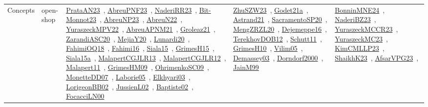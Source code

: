 {\begin{longtable}{lp{3cm}>{\raggedright\arraybackslash}p{6cm}>{\raggedright\arraybackslash}p{6cm}>{\raggedright\arraybackslash}p{8cm}}
\index{open-shop}\index{Concepts!open-shop}Concepts & open-shop & \href{../works/PrataAN23.pdf}{PrataAN23}~\cite{PrataAN23}, \href{../works/AbreuPNF23.pdf}{AbreuPNF23}~\cite{AbreuPNF23}, \href{../works/NaderiRR23.pdf}{NaderiRR23}~\cite{NaderiRR23}, \href{../works/Bit-Monnot23.pdf}{Bit-Monnot23}~\cite{Bit-Monnot23}, \href{../works/AbreuNP23.pdf}{AbreuNP23}~\cite{AbreuNP23}, \href{../works/AbreuN22.pdf}{AbreuN22}~\cite{AbreuN22}, \href{../works/YuraszeckMPV22.pdf}{YuraszeckMPV22}~\cite{YuraszeckMPV22}, \href{../works/AbreuAPNM21.pdf}{AbreuAPNM21}~\cite{AbreuAPNM21}, \href{../works/Groleaz21.pdf}{Groleaz21}~\cite{Groleaz21}, \href{../works/ZarandiASC20.pdf}{ZarandiASC20}~\cite{ZarandiASC20}, \href{../works/MejiaY20.pdf}{MejiaY20}~\cite{MejiaY20}, \href{../works/Lunardi20.pdf}{Lunardi20}~\cite{Lunardi20}, \href{../works/FahimiOQ18.pdf}{FahimiOQ18}~\cite{FahimiOQ18}, \href{../works/Fahimi16.pdf}{Fahimi16}~\cite{Fahimi16}, \href{../works/Siala15.pdf}{Siala15}~\cite{Siala15}, \href{../works/GrimesH15.pdf}{GrimesH15}~\cite{GrimesH15}, \href{../works/Siala15a.pdf}{Siala15a}~\cite{Siala15a}, \href{../works/MalapertCGJLR13.pdf}{MalapertCGJLR13}~\cite{MalapertCGJLR13}, \href{../works/MalapertCGJLR12.pdf}{MalapertCGJLR12}~\cite{MalapertCGJLR12}, \href{../works/Malapert11.pdf}{Malapert11}~\cite{Malapert11}, \href{../works/GrimesHM09.pdf}{GrimesHM09}~\cite{GrimesHM09}, \href{../works/OhrimenkoSC09.pdf}{OhrimenkoSC09}~\cite{OhrimenkoSC09}, \href{../works/MonetteDD07.pdf}{MonetteDD07}~\cite{MonetteDD07}, \href{../works/Laborie05.pdf}{Laborie05}~\cite{Laborie05}, \href{../works/Elkhyari03.pdf}{Elkhyari03}~\cite{Elkhyari03}, \href{../works/LorigeonBB02.pdf}{LorigeonBB02}~\cite{LorigeonBB02}, \href{../works/JussienL02.pdf}{JussienL02}~\cite{JussienL02}, \href{../works/Baptiste02.pdf}{Baptiste02}~\cite{Baptiste02}, \href{../works/FocacciLN00.pdf}{FocacciLN00}~\cite{FocacciLN00} & \href{../works/ZhuSZW23.pdf}{ZhuSZW23}~\cite{ZhuSZW23}, \href{../works/Godet21a.pdf}{Godet21a}~\cite{Godet21a}, \href{../works/Astrand21.pdf}{Astrand21}~\cite{Astrand21}, \href{../works/SacramentoSP20.pdf}{SacramentoSP20}~\cite{SacramentoSP20}, \href{../works/MengZRZL20.pdf}{MengZRZL20}~\cite{MengZRZL20}, \href{../works/Dejemeppe16.pdf}{Dejemeppe16}~\cite{Dejemeppe16}, \href{../works/TerekhovDOB12.pdf}{TerekhovDOB12}~\cite{TerekhovDOB12}, \href{../works/Schutt11.pdf}{Schutt11}~\cite{Schutt11}, \href{../works/GrimesH10.pdf}{GrimesH10}~\cite{GrimesH10}, \href{../works/Vilim05.pdf}{Vilim05}~\cite{Vilim05}, \href{../works/Demassey03.pdf}{Demassey03}~\cite{Demassey03}, \href{../works/Dorndorf2000.pdf}{Dorndorf2000}~\cite{Dorndorf2000}, \href{../works/JainM99.pdf}{JainM99}~\cite{JainM99} & \href{../works/BonninMNE24.pdf}{BonninMNE24}~\cite{BonninMNE24}, \href{../works/NaderiBZ23.pdf}{NaderiBZ23}~\cite{NaderiBZ23}, \href{../works/YuraszeckMCCR23.pdf}{YuraszeckMCCR23}~\cite{YuraszeckMCCR23}, \href{../works/YuraszeckMC23.pdf}{YuraszeckMC23}~\cite{YuraszeckMC23}, \href{../works/KimCMLLP23.pdf}{KimCMLLP23}~\cite{KimCMLLP23}, \href{../works/ShaikhK23.pdf}{ShaikhK23}~\cite{ShaikhK23}, \href{../works/AfsarVPG23.pdf}{AfsarVPG23}~\cite{AfsarVPG23}, 
\end{longtable}}

